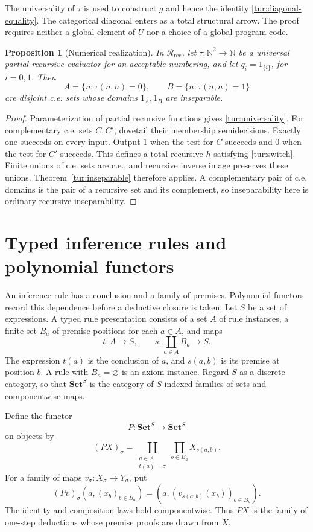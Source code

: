 \documentclass[11pt]{article}
\newtheorem{proposition}[theorem]{Proposition}
\theoremstyle{definition}
\theoremstyle{remark}
\newcommand{\R}{\mathscr R}
\newcommand{\Set}{\mathbf{Set}}
\newcommand{\N}{\mathbb N}
\begin{document}
The universality of $\tau$ is used to construct $g$ and hence the
identity \eqref{tur:diagonal-equality}. The categorical diagonal enters
as a total structural arrow. The proof requires neither a global element
of $U$ nor a choice of a global program code.

\begin{proposition}[Numerical realization]\label{tur:numerical}
In $\R_{\mathrm{rec}}$, let $\tau:\N^2\to\N$ be a universal partial
recursive evaluator for an acceptable numbering, and let
$q_i=1_{\{i\}}$, for $i=0,1$. Then
\[
 A=\{n:\tau(n,n)=0\},\qquad
 B=\{n:\tau(n,n)=1\}
\]
are disjoint c.e. sets whose domains $1_A,1_B$ are inseparable.
\end{proposition}
\begin{proof}
Parameterization of partial recursive functions gives
\eqref{tur:universality}. For complementary c.e. sets $C,C'$, dovetail
their membership semidecisions. Exactly one succeeds on every input.
Output $1$ when the test for $C$ succeeds and $0$ when the test for
$C'$ succeeds. This defines a total recursive $h$ satisfying
\eqref{tur:switch}. Finite unions of c.e. sets are c.e., and recursive
inverse image preserves these unions. Theorem~\ref{tur:inseparable}
therefore applies. A complementary pair of c.e. domains is the pair of
a recursive set and its complement, so inseparability here is ordinary
recursive inseparability.
\end{proof}

\section{Typed inference rules and polynomial functors}\label{poly:typed}

An inference rule has a conclusion and a family of premises. Polynomial
functors record this dependence before a deductive closure is taken.
Let $S$ be a set of expressions. A typed rule presentation consists of a
set $A$ of rule instances, a finite set $B_a$ of premise positions for
each $a\in A$, and maps
\[
 t:A\longrightarrow S,\qquad
 s:\coprod_{a\in A}B_a\longrightarrow S.
\]
The expression $t(a)$ is the conclusion of $a$, and $s(a,b)$ is its
premise at position $b$. A rule with $B_a=\varnothing$ is an axiom
instance. Regard $S$ as a discrete category, so that $\Set^S$ is the
category of $S$-indexed families of sets and componentwise maps.

Define the functor
\begin{equation}\label{poly:family-type}
 P:\Set^S\longrightarrow\Set^S
\end{equation}
on objects by
\begin{equation}\label{poly:family-formula}
 (PX)_\sigma=
 \coprod_{\substack{a\in A\\t(a)=\sigma}}
 \prod_{b\in B_a}X_{s(a,b)}.
\end{equation}
For a family of maps $v_\sigma:X_\sigma\to Y_\sigma$, put
\[
 (Pv)_\sigma(a,(x_b)_{b\in B_a})
   =(a,(v_{s(a,b)}(x_b))_{b\in B_a}).
\]
The identity and composition laws hold componentwise. Thus $PX$ is the
family of one-step deductions whose premise proofs are drawn from $X$.
\end{document}
